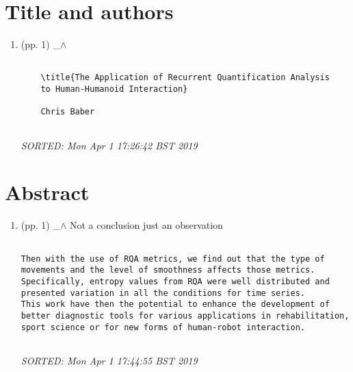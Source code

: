 \documentclass[12pt]{article}
\begin{document}
\maketitle


\begin{abstract}
This document presents a log-book for the corrections
of \emph{.../corrections/29-04-2019/comments/scanned-draft.pdf}.
\end{abstract}




\section{Title and authors}


\begin{enumerate}

\item  (pp. 1)  \_$\wedge$  

	\begin{verbatim}
	
	\title{The Application of Recurrent Quantification Analysis 
	to Human-Humanoid Interaction}

	Chris Baber 
	
	\end{verbatim}
	\textit{
	SORTED:  Mon Apr  1 17:26:42 BST 2019
	}
	\\


\end{enumerate}



\section{Abstract}


\begin{enumerate}

\item  (pp. 1)  \_$\wedge$  Not a conclusion just an observation

	\begin{verbatim}

Then with the use of RQA metrics, we find out that the type of 
movements and the level of smoothness affects those metrics. 
Specifically, entropy values from RQA were well distributed and 
presented variation in all the conditions for time series. 
This work have then the potential to enhance the development of 
better diagnostic tools for various applications in rehabilitation, 
sport science or for new forms of human-robot interaction.
	
	\end{verbatim}
	\textit{
	SORTED:  Mon Apr  1 17:44:55 BST 2019
	}
	\\


\end{enumerate}
\end{document}
